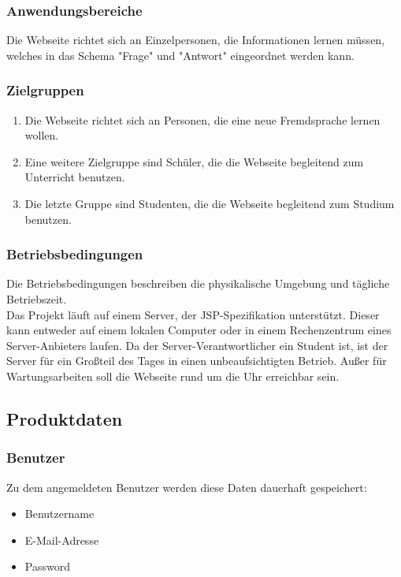 \subsubsection{Anwendungsbereiche}
Die Webseite richtet sich an Einzelpersonen, die Informationen lernen müssen, welches in das Schema "Frage" und "Antwort" eingeordnet werden kann.

\subsubsection{Zielgruppen}
\begin{enumerate}[leftmargin=2cm, label=\bfseries /ZG\arabic*0/]
	\item Die Webseite richtet sich an Personen, die eine neue Fremdsprache lernen wollen.
	\item Eine weitere Zielgruppe sind Schüler, die die Webseite begleitend zum Unterricht benutzen.
	\item Die letzte Gruppe sind Studenten, die die Webseite begleitend zum Studium benutzen.
\end{enumerate}


\subsubsection{Betriebsbedingungen}
Die Betriebsbedingungen beschreiben die physikalische Umgebung und tägliche Betriebszeit.\\

\noindent Das Projekt läuft auf einem Server, der JSP-Spezifikation unterstützt. Dieser kann entweder auf einem lokalen Computer oder in einem Rechenzentrum eines Server-Anbieters laufen. Da der Server-Verantwortlicher ein Student ist, ist der Server für ein Großteil des Tages in einen unbeaufsichtigten Betrieb. Außer für Wartungsarbeiten soll die Webseite rund um die Uhr erreichbar sein.


\subsection{Produktdaten}
\subsubsection{Benutzer}
Zu dem angemeldeten Benutzer werden diese Daten dauerhaft gespeichert:
\begin{itemize}
	\item Benutzername
	\item E-Mail-Adresse
	\item Password
\end{itemize}

